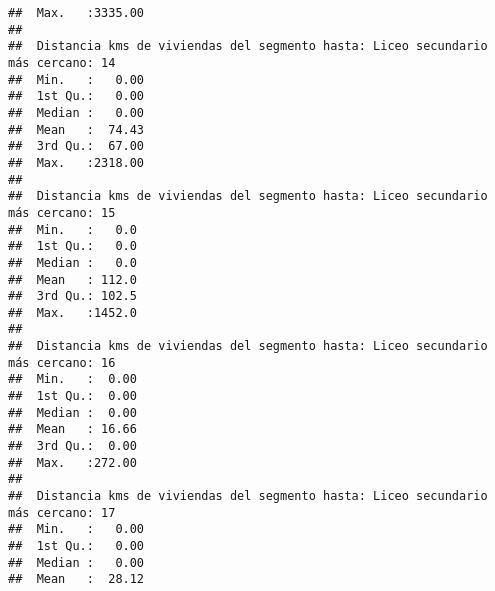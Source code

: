 \documentclass[11pt,]{article}
\begin{document}
\begin{verbatim}
##  Max.   :3335.00                                                                
##                                                                                 
##  Distancia kms de viviendas del segmento hasta: Liceo secundario más cercano: 14
##  Min.   :   0.00                                                                
##  1st Qu.:   0.00                                                                
##  Median :   0.00                                                                
##  Mean   :  74.43                                                                
##  3rd Qu.:  67.00                                                                
##  Max.   :2318.00                                                                
##                                                                                 
##  Distancia kms de viviendas del segmento hasta: Liceo secundario más cercano: 15
##  Min.   :   0.0                                                                 
##  1st Qu.:   0.0                                                                 
##  Median :   0.0                                                                 
##  Mean   : 112.0                                                                 
##  3rd Qu.: 102.5                                                                 
##  Max.   :1452.0                                                                 
##                                                                                 
##  Distancia kms de viviendas del segmento hasta: Liceo secundario más cercano: 16
##  Min.   :  0.00                                                                 
##  1st Qu.:  0.00                                                                 
##  Median :  0.00                                                                 
##  Mean   : 16.66                                                                 
##  3rd Qu.:  0.00                                                                 
##  Max.   :272.00                                                                 
##                                                                                 
##  Distancia kms de viviendas del segmento hasta: Liceo secundario más cercano: 17
##  Min.   :   0.00                                                                
##  1st Qu.:   0.00                                                                
##  Median :   0.00                                                                
##  Mean   :  28.12                                                                

\end{verbatim}
\end{document}

